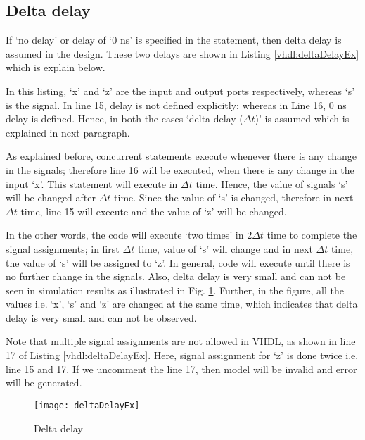 \subsection{Delta delay}
If `no delay' or delay of `0 ns' is specified in the statement, then delta delay is assumed in the design. These two delays are shown in Listing \ref{vhdl:deltaDelayEx} which is explain below. 
\begin{explanation}
	In this listing, `x' and `z' are the input and output ports respectively, whereas `s' is the signal. In line 15, delay is not defined explicitly; whereas in Line 16, 0 ns delay is defined. Hence, in both the cases `delta delay ($\Delta t$)' is assumed which is explained in next paragraph. 
	
	As explained before, concurrent statements execute whenever there is any change in the signals; therefore line 16 will be executed, when there is any change in the input `x'. This statement will execute in $\Delta t$ time. Hence, the value of signals `s' will be changed after $\Delta t$ time. Since the value of `s' is changed, therefore in next $\Delta t$ time, line 15 will execute and the value of `z' will be changed. 
	
	In the other words, the code will execute `two times' in $2\Delta t$ time to complete the signal assignments; in first $\Delta t$ time, value of `s' will change and in next $\Delta t$ time, the value of `s' will be assigned to `z'. In general, code will execute until there is no further change in the signals. Also, delta delay is very small and can not be seen in simulation results as illustrated in Fig. \ref  {fig:deltaDelayEx}.	Further, in the figure, all the values i.e. `x', `s' and `z' are changed at the same time, which indicates that delta delay is very small and can not be observed. 
	
	\begin{noNumBox}
	 Note that	multiple signal assignments are not allowed in VHDL, as shown in line 17 of Listing \ref{vhdl:deltaDelayEx}. Here, signal assignment for `z' is done twice i.e. line 15 and 17. If we uncomment the line 17, then model will be invalid and error will be generated. 
	\end{noNumBox}
\end{explanation}



\begin{figure}[!h]
	\centering
	\texttt{[image: deltaDelayEx]}
	\caption{Delta delay}
	\label{fig:deltaDelayEx}
\end{figure}

